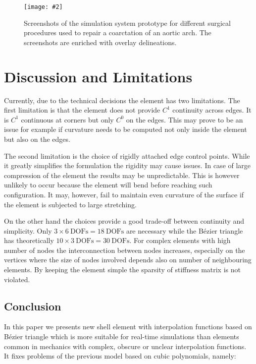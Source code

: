 \documentclass{egpubl}
\newcommand{\FigureW}[3]{%
\begin{figure*}[htb]
  \centering
  \texttt{[image: \#2]}
  \caption{\label{fig-#2}#3}
\end{figure*}}
\begin{document}
\FigureW{0.75\linewidth}{chd}
{Screenshots of the simulation system prototype for different surgical
procedures used to repair a coarctation of an aortic arch. The screenshots
are enriched with overlay delineations.}




\section{Discussion and Limitations} %

Currently, due to the technical decisions the element has two limitations.
The first limitation is that the element does not provide $C^1$ continuity
across edges. It is $C^1$ continuous at corners but only $C^0$ on the
edges. This may prove to be an issue for example if curvature needs to be
computed not only inside the element but also on the edges.

The second limitation is the choice of rigidly attached edge control
points. While it greatly simplifies the formulation the rigidity may cause
issues. In case of large compression of the element the results may be
unpredictable. This is however unlikely to occur because the element will
bend before reaching such configuration. It may, however, fail to maintain
even curvature of the surface if the element is subjected to large
stretching.

On the other hand the choices provide a good trade-off between continuity
and simplicity. Only $ 3 \times 6~\mathrm{DOFs} = 18~\mathrm{DOFs}$ are
necessary while the B\'ezier triangle has theoretically $ 10 \times
3~\mathrm{DOFs} = 30~\mathrm{DOFs}$. For complex elements with high number
of nodes the interconnection between nodes increases, especially on the
vertices where the size of nodes involved depends also on number of
neighbouring elements. By keeping the element simple the sparsity of
stiffness matrix is not violated.


\subsection{Conclusion} %

In this paper we presents new shell element with interpolation functions
based on B\'ezier triangle which is more suitable for real-time simulations than elements common in mechanics with complex, obscure or unclear interpolation functions.
It fixes problems of the previous model \cite{Comas2010c} based on cubic polynomials, namely:
\end{document}
